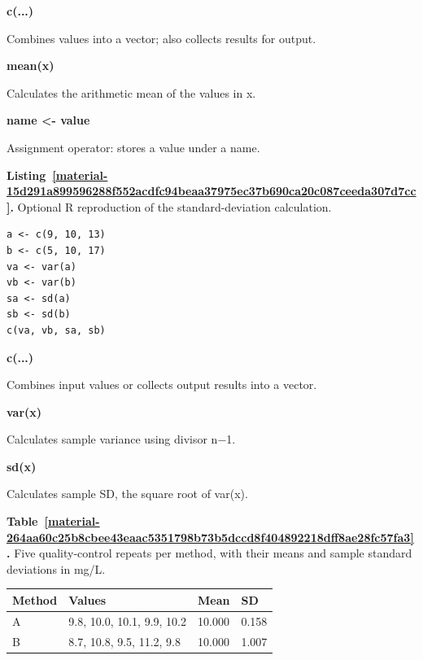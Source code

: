 \documentclass[11pt,a4paper]{article}
\newcounter{listing}
\newcounter{scripttable}
\begin{document}
\par\noindent\textbf{c(...)}

Combines values into a vector; also collects results for output.

\par\noindent\textbf{mean(x)}

Calculates the arithmetic mean of the values in x.

\par\noindent\textbf{name <- value}

Assignment operator: stores a value under a name.

\medskip

\par\medskip
{}
\label{material-15d291a899596288f552acdfc94beaa37975ec37b690ca20c087ceeda307d7cc}
\noindent\textbf{Listing~\ref*{material-15d291a899596288f552acdfc94beaa37975ec37b690ca20c087ceeda307d7cc}.} Optional R reproduction of the standard-deviation calculation.\par\nopagebreak
\begin{Verbatim}[fontsize=\footnotesize,breaklines=true,breakanywhere=true]
a <- c(9, 10, 13)
b <- c(5, 10, 17)
va <- var(a)
vb <- var(b)
sa <- sd(a)
sb <- sd(b)
c(va, vb, sa, sb)
\end{Verbatim}

\par\noindent\textbf{c(...)}

Combines input values or collects output results into a vector.

\par\noindent\textbf{var(x)}

Calculates sample variance using divisor n\ensuremath{-}1.

\par\noindent\textbf{sd(x)}

Calculates sample SD, the square root of var(x).

\medskip

\par\medskip
{}
\label{material-264aa60c25b8cbee43eaac5351798b73b5dccd8f404892218dff8ae28fc57fa3}
\noindent\textbf{Table~\ref*{material-264aa60c25b8cbee43eaac5351798b73b5dccd8f404892218dff8ae28fc57fa3}.} Five quality-control repeats per method, with their means and sample standard deviations in mg/L.\par\nopagebreak
\begin{longtable}{@{}p{}p{}p{}p{}@{}}
Method & Values & Mean & SD \\ \hline
\endhead
A & 9.8, 10.0, 10.1, 9.9, 10.2 & 10.000 & 0.158 \\ \hline
B & 8.7, 10.8, 9.5, 11.2, 9.8 & 10.000 & 1.007 \\ \hline
\end{longtable}
\medskip
\end{document}

